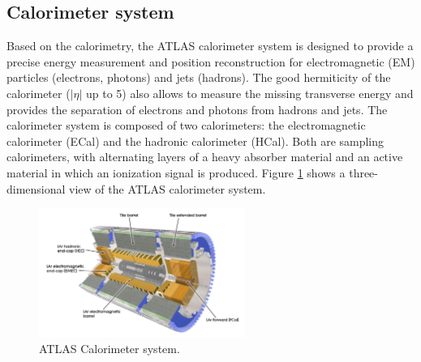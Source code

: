 \subsection{Calorimeter system}
\label{chap2:ATLAS:Calo}
Based on the calorimetry, the ATLAS calorimeter system is designed to provide a precise energy measurement and position reconstruction for electromagnetic (EM) particles (electrons, photons) and jets (hadrons). The good hermiticity of the calorimeter ($|\eta|$ up to 5) also allows to measure the missing transverse energy and provides the separation of electrons and photons from hadrons and jets. The calorimeter system is composed of two calorimeters: the electromagnetic calorimeter (ECal) and the hadronic calorimeter (HCal). Both are sampling calorimeters, with alternating layers of a heavy absorber material and an active material in which an ionization signal is produced. Figure \ref{fig:chap2:ATLAS:Calo} shows a three-dimensional view of the ATLAS calorimeter system.
\begin{figure}[htbp]
    \centering
    \includegraphics[width=0.6\textwidth]{Ch2/Img/Calo.png}
    \caption{ATLAS Calorimeter system.}
    \label{fig:chap2:ATLAS:Calo}
\end{figure}

